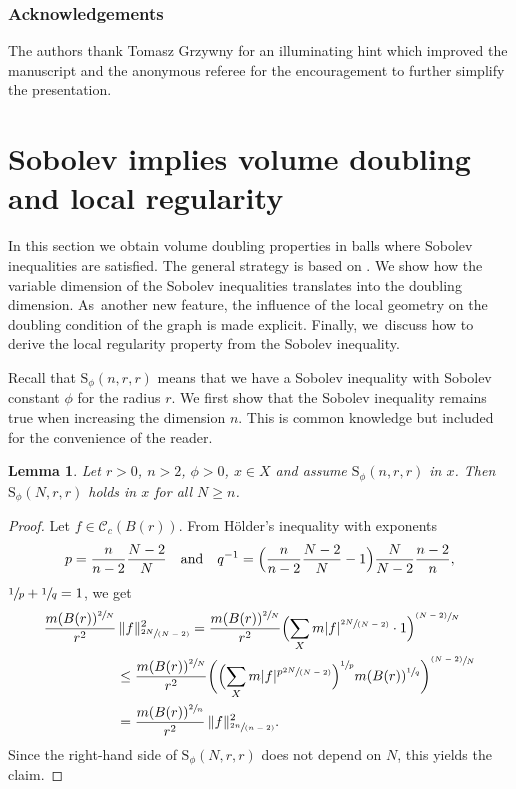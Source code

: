 \documentclass[JEP,XML,SOM,Unicode,published]{cedram}
\newcommand{\psfrac}[2]{\sfrac{(#1)}{#2}}
\newcommand{\spfrac}[2]{\sfrac{#1}{(#2)}}
\newcommand{\rS}{\mathrm{S}}
\theoremstyle{plain}
\newtheorem{lemma}[theorem]{Lemma}
\theoremstyle{definition}
\newcommand{\cC}{\mathcal{C}}
\begin{document}
\subsubsection*{Acknowledgements}
The authors thank Tomasz Grzywny for an illuminating hint which improved the manuscript and the anonymous referee for the encouragement to further simplify the presentation.

\section{Sobolev implies volume doubling and local regularity}\label{section:doubling}

In this section we obtain volume doubling properties in balls where Sobolev inequalities are satisfied. The general strategy is based on \cite{SaloffC-01}. We show how the variable dimension of the Sobolev inequalities {translates into} the doubling dimension. As~another new feature, the influence of the local geometry on the doubling condition of the graph is made explicit. Finally, we~discuss how to derive the local regularity property from the Sobolev inequality.

Recall that $\rS_\phi(n,r,r)$ means that we have a Sobolev inequality with Sobolev constant $ \phi $ for the radius $ r $. We first show that the Sobolev inequality remains true when increasing the dimension $ n $. This is common knowledge but included for the convenience of the reader.

\begin{lemma}\label{lem:sobdim} Let $r>0$, $n>2$, $\phi>0$, $x\in X$ and assume $\rS_\phi(n, r,r)$ in $x$. Then $\rS_\phi(N,r,r)$ holds in $x$ for all $N\geq n$.
\end{lemma}
\begin{proof}
Let $f\in\cC_{c}(B(r))$. From Hölder's inequality with exponents
\[
p=\frac{n}{n-2}\frac{N-2}{N}\quad\text{and}\quad q^{-1}=\Bigl(\frac{n}{n-2}\frac{N-2}{N}-1\Bigr)\frac{N}{N-2}\frac{n-2}{n},
\]
\ie $ \sfrac1p+\sfrac1q=1 $, we get
\begin{align*}
\frac{m(B(r))^{\sfrac{2}{N}}}{r^2}&\,\Vert f\Vert_{\spfrac{2N}{N-2}}^2 =\frac{m(B(r))^{\sfrac{2}{N}}}{r^2}\Bigl(\sum_{X} m |f|^{\spfrac{2N}{N-2}}\cdot 1\Bigr)^{\psfrac{N-2}{N}}
\\
&\leq
\frac{m(B(r))^{\sfrac{2}{N}}}{r^2}\biggl(\Bigl(\sum_{X} m |f|^{p\spfrac{2N}{N-2}}\Bigr)^{\sfrac{1}{p}}m(B(r))^{\sfrac{1}{q}}\biggr)^{\psfrac{N-2}{N}}\\
&=\frac{m(B(r))^{\sfrac{2}{n}}}{r^2}\,\Vert f\Vert_{\spfrac{2n}{n-2}}^2.
\end{align*}
Since the right-hand side of $\rS_{\phi}(N,r,r)$ does not depend on $ N $, this yields the claim.
\end{proof}
\end{document}
